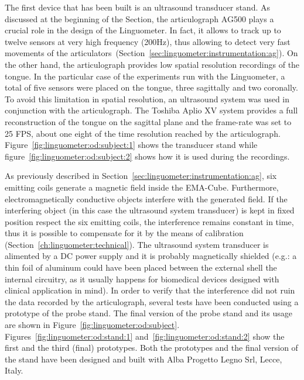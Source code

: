 The first device that has been built is an ultrasound transducer stand.
As discussed at the beginning of the Section, the articulograph AG500 plays a
crucial role in the design of the Linguometer. 
In fact, it allows to track up to twelve sensors at very high frequency (200Hz),
thus allowing to detect very fast movements of the
articulators~(Section~\ref{sec:linguometer:instrumentation:ag}).
On the other hand, the articulograph provides low spatial resolution recordings
of the tongue.
In the particular case of the experiments run with the Linguometer, a total of 
five sensors were placed on the tongue, three sagittally and two coronally.
To avoid this limitation in spatial resolution, an ultrasound system was used 
in conjunction with the articulograph.
The Toshiba Aplio XV system provides a full reconstruction of the tongue on the
sagittal plane and the frame-rate was set to 25 FPS, about one eight of the time
resolution reached by the articulograph.
Figure~\ref{fig:linguometer:od:subject:1} shows the transducer stand
while figure~\ref{fig:linguometer:od:subject:2} shows how it is used during the
recordings.


As previously described in Section~\ref{sec:linguometer:instrumentation:ag},
six emitting coils generate a magnetic field inside the EMA-Cube.
Furthermore, electromagnetically conductive objects interfere with
the generated field.
If the interfering object (in this case the ultrasound system transducer) 
is kept in fixed position respect the six emitting coils, the interference
remains  constant in time, thus it is possible to compensate
for it by the means of calibration (Section~\ref{ch:linguometer:technical}).
The ultrasound system transducer is alimented by a DC power supply and it is
probably magnetically shielded (e.g.: a thin foil of aluminum could have been
placed between the external shell the internal circuitry, as it usually 
happens for biomedical devices designed with clinical application in mind).
In order to verify that the interference did not ruin the data recorded by 
the articulograph, several tests have been conducted using a prototype of the
probe stand.
The final version of the probe stand and its usage are shown in 
Figure~\ref{fig:linguometer:od:subject}.
Figures~\ref{fig:linguometer:od:stand:1} 
and~\ref{fig:linguometer:od:stand:2} show the first and the third (final)
prototypes.
Both the prototypes and the final version of the stand have been designed 
and built with Alba Progetto Legno Srl, Lecce, Italy. 

